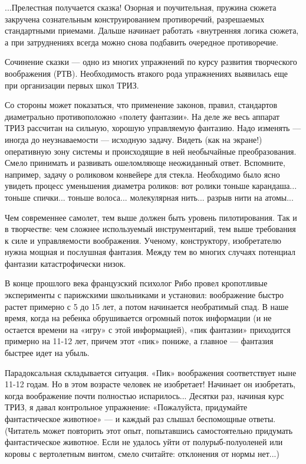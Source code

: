 ...Прелестная  получается  сказка!  Озорная  и  поучительная,  пружина
сюжета    закручена   сознательным    конструированием   противоречий,
разрешаемых   стандартными   приемами.    Дальше   начинает   работать
«внутренняя  логика  сюжета, а  при  затруднениях  всегда можно  снова
подбавить очередное противоречие.


Сочинение  сказки  —  одно  из многих  упражнений  по  курсу  развития
творческого воображения (РТВ).  Необходимость втакого рода упражнениях
выявилась еще при организации первых школ ТРИЗ.

Со  стороны   может  показаться,   что  применение   законов,  правил,
стандартов диаметрально  противоположно «полету фантазии». На  деле же
весь аппарат ТРИЗ рассчитан  на сильную, хорошую управляемую фантазию.
Надо изменять  — иногда  до неузнаваемости  — исходную  задачу. Видеть
(как  на  экране!)  оперативную  зону системы  и  происходящие  в  ней
необычайные  преобразования. Смело  принимать и  развивать ошеломляюще
неожиданный ответ.  Вспомните, например, задачу о  роликовом конвейере
для стекла.  Необходимо было ясно увидеть  процесс уменьшения диаметра
роликов:  вот  ролики  тоньше  карандаша...  тоньше  спички...  тоньше
волоса... молекулярная нить... разрыв нити на атомы...

Чем современнее  самолет, тем выше должен  быть уровень пилотирования.
Так и в творчестве: чем  сложнее используемый инструментарий, тем выше
требования к силе и  управляемости воображения. Ученому, конструктору,
изобретателю нужна  мощная и послушная  фантазия. Между тем  во многих
случаях потенциал фантазии катастрофически низок.

В  конце прошлого  века французский  психолог Рибо  провел кропотливые
эксперименты с парижскими школьниками  и установил: воображение быстро
растет примерно с 5 до 15  лет, а потом начинается необратимый спад. В
наше время, когда на ребенка обрушивается огромный поток информации (и
не  остается времени  на «игру»  с этой  информацией), «пик  фантазии»
приходится примерно на 11-12 лет,  причем этот «пик» пониже, а главное
— фантазия быстрее идет на убыль.

Парадоксальная складывается ситуация.  «Пик» воображения соответствует
ныне 11-12 годам.  Но в этом возрасте человек  не изобретает! Начинает
он  изобретать,   когда  воображение  почти   полностью  испарилось...
Десятки  раз,  начиная  курс  ТРИЗ, я  давал  контрольное  упражнение:
«Пожалуйста, придумайте фантастическое животное» — и каждый раз слышал
беспомощные ответы.  (Читатель может повторить этот  опыт, попытавшись
самостоятельно придумать фантастическое животное. Если не удалось уйти
от полурыб-полуоленей или коровы с вертолетным винтом, смело считайте:
отклонения от нормы нет...)


